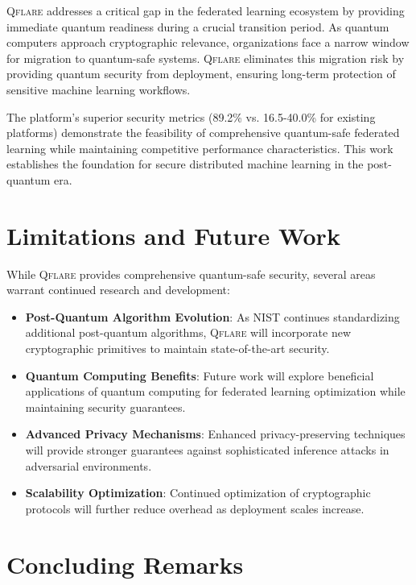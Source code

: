 ﻿\documentclass[12pt,a4paper,twoside]{book}
\newcommand{\qflare}{\textsc{Qflare}}
\begin{document}
\qflare{} addresses a critical gap in the federated learning ecosystem by providing immediate quantum readiness during a crucial transition period. As quantum computers approach cryptographic relevance, organizations face a narrow window for migration to quantum-safe systems. \qflare{} eliminates this migration risk by providing quantum security from deployment, ensuring long-term protection of sensitive machine learning workflows.

The platform's superior security metrics (89.2\% vs. 16.5-40.0\% for existing platforms) demonstrate the feasibility of comprehensive quantum-safe federated learning while maintaining competitive performance characteristics. This work establishes the foundation for secure distributed machine learning in the post-quantum era.

\section{Limitations and Future Work}
\label{sec:limitations}

While \qflare{} provides comprehensive quantum-safe security, several areas warrant continued research and development:

\begin{itemize}
\item \textbf{Post-Quantum Algorithm Evolution}: As NIST continues standardizing additional post-quantum algorithms, \qflare{} will incorporate new cryptographic primitives to maintain state-of-the-art security.

\item \textbf{Quantum Computing Benefits}: Future work will explore beneficial applications of quantum computing for federated learning optimization while maintaining security guarantees.

\item \textbf{Advanced Privacy Mechanisms}: Enhanced privacy-preserving techniques will provide stronger guarantees against sophisticated inference attacks in adversarial environments.

\item \textbf{Scalability Optimization}: Continued optimization of cryptographic protocols will further reduce overhead as deployment scales increase.
\end{itemize}

\section{Concluding Remarks}
\label{sec:concluding-remarks}
\end{document}
